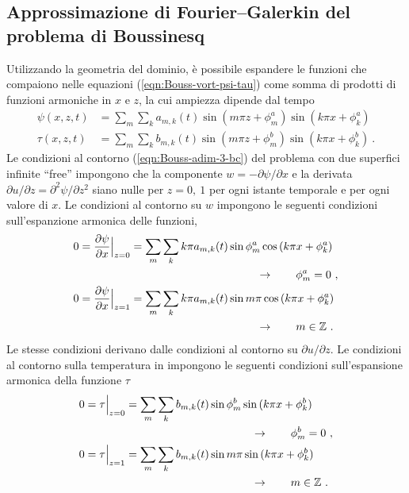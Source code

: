 \subsection{Approssimazione di Fourier--Galerkin del problema di Boussinesq}
Utilizzando la geometria del dominio, è possibile espandere le funzioni che compaiono nelle equazioni (\ref{eqn:Bouss-vort-psi-tau}) come somma di prodotti di funzioni armoniche in $x$ e $z$, la cui ampiezza dipende dal tempo
\begin{equation}\label{eqn:harm-1}
\begin{aligned}
    \psi(x,z,t) & = \sum_m \sum_k a_{m,k}(t) \sin{(m\pi z + \phi^a_m)}\sin{(k\pi x + \phi^a_k)} \\
    \tau(x,z,t) & = \sum_m \sum_k b_{m,k}(t) \sin{(m\pi z + \phi^b_m)}\sin{(k\pi x + \phi^b_k)} \ .
\end{aligned}
\end{equation}
Le condizioni al contorno (\ref{eqn:Bouss-adim-3-bc}) del problema con due superfici infinite ``free'' impongono che la componente $w=-\partial{\psi}/\partial{x}$ e la derivata $\partial u/\partial z = \partial^2 \psi/\partial z^2$ siano nulle per $z = 0, \ 1$ per ogni istante temporale e per ogni valore di $x$. Le condizioni al contorno su $w$ impongono le seguenti condizioni sull'espanzione armonica delle funzioni,
\begin{equation}
    \begin{aligned}
      0 = \dfrac{\partial \psi}{\partial x}\Big|_{z=0} & = \sum_m \sum_k k \pi a_{m,k}(t) \sin{ \phi^a_m }\cos{(k\pi x + \phi^a_k)} \\
      & \hspace{4.0cm} \rightarrow \qquad \phi^a_m = 0 \ , \\
      0 = \dfrac{\partial \psi}{\partial x}\Big|_{z=1} & = \sum_m \sum_k k \pi a_{m,k}(t) \sin{ m \pi }\cos{(k\pi x + \phi^a_k)} \\
      & \hspace{4.0cm} \rightarrow \qquad m \in \mathbb{Z} \ .
    \end{aligned}
\end{equation}
Le stesse condizioni derivano dalle condizioni al contorno su $\partial u/\partial z$.
%
Le condizioni al contorno sulla temperatura in impongono le seguenti condizioni sull'espansione armonica della funzione $\tau$
\begin{equation}
    \begin{aligned}
      0 = \tau \Big|_{z=0} & = \sum_m \sum_k b_{m,k}(t) \sin{ \phi^b_m }\sin{(k\pi x + \phi^b_k)} \\
      & \hspace{4.0cm} \rightarrow \qquad \phi^b_m = 0 \ ,\\
      0 = \tau \Big|_{z=1} & = \sum_m \sum_k b_{m,k}(t) \sin{ m \pi }\sin{(k\pi x + \phi^b_k)} \\
      & \hspace{4.0cm} \rightarrow \qquad m \in \mathbb{Z} \ .
    \end{aligned}
\end{equation}
